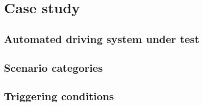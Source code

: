 \section{Case study}
\label{sec:case study}



\subsection{Automated driving system under test}
\label{sec:ads under test}



\subsection{Scenario categories}
\label{sec:scenario categories}



\subsection{Triggering conditions}
\label{sec:triggering conditions}
